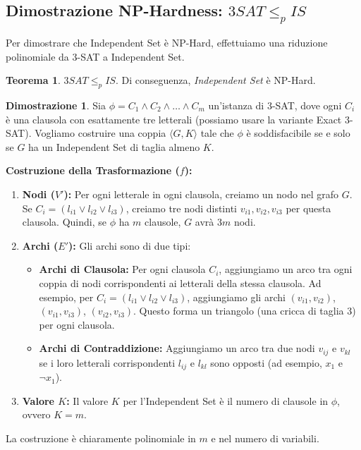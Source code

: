 \documentclass[a4paper]{article}
\theoremstyle{definition} %
\newtheorem{theorem}{Teorema}
[section]
\theoremstyle{definition} %
\newtheorem*{proof*}{Dimostrazione}
\begin{document}
\subsection{Dimostrazione NP-Hardness: $3SAT \le_p IS$}

Per dimostrare che Independent Set è NP-Hard, effettuiamo una riduzione polinomiale da 3-SAT a Independent Set.

\begin{theorem}
$3SAT \le_p IS$. Di conseguenza, \emph{Independent Set} è NP-Hard.
\end{theorem}

\begin{proof*}
Sia $\phi = C_1 \land C_2 \land \dots \land C_m$ un'istanza di 3-SAT, dove ogni $C_i$ è una clausola con esattamente tre letterali (possiamo usare la variante Exact 3-SAT). Vogliamo costruire una coppia $\langle G, K \rangle$ tale che $\phi$ è soddisfacibile se e solo se $G$ ha un Independent Set di taglia almeno $K$.

\textbf{Costruzione della Trasformazione ($f$):}
\begin{enumerate}
    \item \textbf{Nodi ($V'$):} Per ogni letterale in ogni clausola, creiamo un nodo nel grafo $G$. Se $C_i = (l_{i1} \lor l_{i2} \lor l_{i3})$, creiamo tre nodi distinti $v_{i1}, v_{i2}, v_{i3}$ per questa clausola.
    Quindi, se $\phi$ ha $m$ clausole, $G$ avrà $3m$ nodi.
    \item \textbf{Archi ($E'$):} Gli archi sono di due tipi:
    \begin{itemize}
        \item \textbf{Archi di Clausola:} Per ogni clausola $C_i$, aggiungiamo un arco tra ogni coppia di nodi corrispondenti ai letterali della stessa clausola. Ad esempio, per $C_i = (l_{i1} \lor l_{i2} \lor l_{i3})$, aggiungiamo gli archi $(v_{i1}, v_{i2})$, $(v_{i1}, v_{i3})$, $(v_{i2}, v_{i3})$. Questo forma un triangolo (una cricca di taglia 3) per ogni clausola.
        \item \textbf{Archi di Contraddizione:} Aggiungiamo un arco tra due nodi $v_{ij}$ e $v_{kl}$ se i loro letterali corrispondenti $l_{ij}$ e $l_{kl}$ sono opposti (ad esempio, $x_1$ e $\neg x_1$).
    \end{itemize}
    \item \textbf{Valore $K$:} Il valore $K$ per l'Independent Set è il numero di clausole in $\phi$, ovvero $K=m$.
\end{enumerate}
La costruzione è chiaramente polinomiale in $m$ e nel numero di variabili.


\end{proof*}
\end{document}
